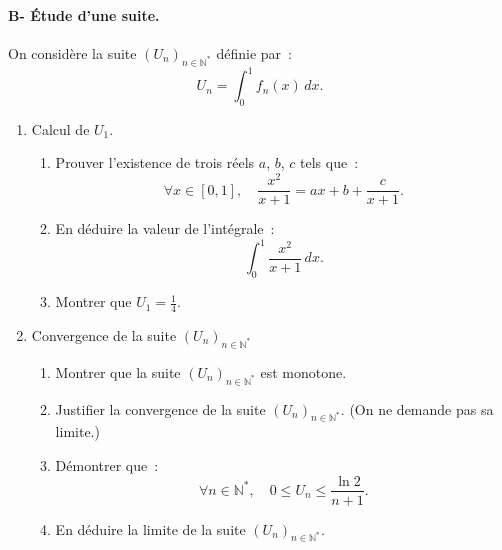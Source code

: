 \begin{exercice}
\paragraph{B- \'Etude d'une suite.\\}

On consid\`ere la suite $\left(U_n\right)_{n\in\mathbb{N}^*}$ d\'efinie
par~: 
\begin{equation*}
U_n=\int_0^1f_n(x)\,dx.
\end{equation*}
\begin{enumerate}
\item Calcul de $U_1$.


\begin{enumerate}
\item Prouver l'existence de trois r\'{e}els $a$, $b$, $c$ tels que~: 
\begin{equation*}
\forall x\in [0,1],\quad \frac{x^{2}}{x+1}=ax+b+\frac{c}{x+1}.
\end{equation*}

\item En d\'{e}duire la valeur de l'int\'{e}grale~: 
\begin{equation*}
\int_{0}^{1}\frac{x^{2}}{x+1}\,dx.
\end{equation*}

\item Montrer que $\displaystyle U_{1}=\frac{1}{4}$.
\end{enumerate}

\item Convergence de la suite $\left(U_n\right)_{n\in\mathbb{N}^*}$\\

\begin{enumerate}
\item Montrer que la suite $\left( U_{n}\right) _{n\in \mathbb{N}^{*}}$ est
monotone.

\item Justifier la convergence de la suite $\left( U_{n}\right) _{n\in 
\mathbb{N}^{*}}$. (On ne demande pas sa limite.)

\item D\'{e}montrer que~: 
\begin{equation*}
\forall n\in \mathbb{N}^{*},\quad 0\leqslant U_{n}\leqslant \frac{\ln 2}{n+1}%
.
\end{equation*}

\item En d\'{e}duire la limite de la suite $\left( U_{n}\right) _{n\in 
\mathbb{N}^{*}}$.
\end{enumerate}



\end{enumerate}
\end{exercice}
